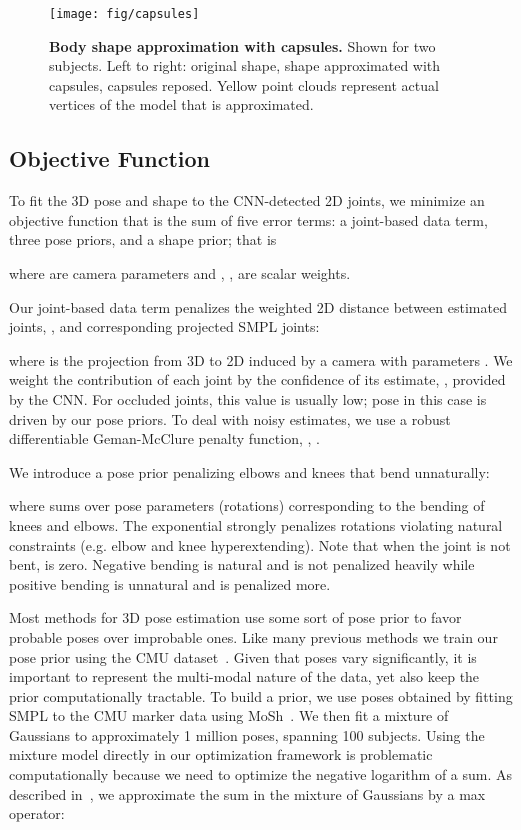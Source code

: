 \documentclass[runningheads]{llncs}
\begin{document}
\begin{figure}[t]
\centerline{
\texttt{[image: fig/capsules]}
}
\caption{{\bf Body shape approximation with capsules.}
Shown for two subjects.  Left to right: original shape, shape approximated with capsules, capsules reposed.
Yellow point clouds represent actual vertices of the model that is approximated.
}
\label{fig:capsules}
\end{figure}

\subsection{Objective Function}
\label{subsec:objectives}

To fit the 3D pose and shape to the CNN-detected 2D joints, we minimize an objective function that is the sum of five error terms: a
joint-based data term, three pose priors, and a shape prior; that is 

where  are camera parameters
and , , 
 are scalar weights.

Our joint-based data term penalizes the weighted 2D distance between
estimated joints, , and corresponding projected SMPL joints:

where  is the projection from 3D to 2D induced by a camera with parameters .
We weight the contribution of each joint by the confidence of its
estimate, , provided by the CNN. For occluded joints, this value is usually low; pose in this case is driven by our pose priors.
To deal with noisy estimates, we use a robust differentiable
Geman-McClure penalty function, , \cite{geman}.

We introduce a pose prior penalizing elbows and knees that bend unnaturally:

where  sums over pose parameters (rotations) corresponding to the
bending of knees and elbows. The exponential strongly penalizes rotations violating natural
constraints (e.g. elbow and knee hyperextending).
Note that when the joint is not bent,  is zero.
Negative bending is natural and is not penalized heavily while
positive bending is unnatural and is penalized more.

Most methods for 3D pose estimation use some sort of pose prior to
favor probable poses over improbable ones.
Like many previous methods we train our pose prior using the CMU dataset~\cite{cmu}.
Given that poses vary significantly, it is important to represent the
multi-modal nature of the data, yet also keep the prior
computationally tractable.
To build a prior, we use poses obtained by fitting SMPL to the CMU marker data using MoSh~\cite{Loper:SIGASIA:2014}.
We then fit  a mixture of Gaussians to approximately
1 million poses, spanning 100 subjects. Using the mixture model directly in our optimization framework is problematic computationally because we need to optimize the negative
logarithm of a sum.
As described in~\cite{Olson:IJRR:2013}, we approximate the sum in the mixture of
Gaussians by a max operator:
\end{document}
